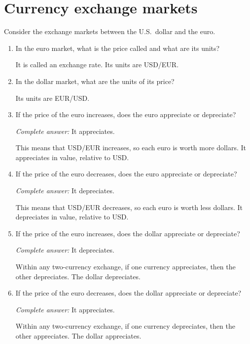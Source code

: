 \documentclass{assignment}
\date{Sunday 18 December 2022}
\begin{document}
\RaggedRight

\beginsolutions{}

\section{Currency exchange markets}

Consider the exchange markets between the U.S.~dollar and the euro.

\begin{enumerate}

\item In the euro market, what is the price called and what are its units?

\begin{solution}
It is called an exchange rate. Its units are USD/EUR.
\end{solution}

\item In the dollar market, what are the units of its price?

\begin{solution}
Its units are EUR/USD.
\end{solution}

\item If the price of the euro increases, does the euro appreciate or depreciate?

\begin{solution}
\emph{Complete answer:} It appreciates.

This means that USD/EUR increases, so each euro is worth more dollars. It appreciates in value, relative to USD.
\end{solution}

\item If the price of the euro decreases, does the euro appreciate or depreciate?

\begin{solution}
\emph{Complete answer:} It depreciates.

This means that USD/EUR decreases, so each euro is worth less dollars. It depreciates in value, relative to USD.
\end{solution}

\item If the price of the euro increases, does the dollar appreciate or depreciate?

\begin{solution}
\emph{Complete answer:} It depreciates.

Within any two-currency exchange, if one currency appreciates, then the other depreciates. The dollar depreciates.
\end{solution}

\item If the price of the euro decreases, does the dollar appreciate or depreciate?

\begin{solution}
\emph{Complete answer:} It appreciates.

Within any two-currency exchange, if one currency depreciates, then the other appreciates. The dollar appreciates.
\end{solution}

\end{enumerate}
\end{document}
